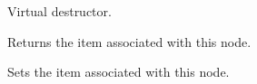 \label{wxtreeitemdatadtor}


Virtual destructor.

\label{wxtreeitemdatagetid}


Returns the item associated with this node.

\label{wxtreeitemdatasetid}


Sets the item associated with this node.


